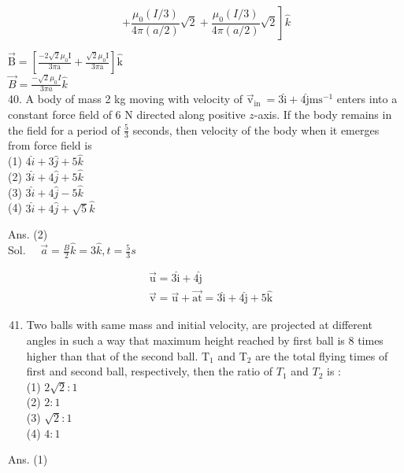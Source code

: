 \documentclass[10pt]{article}
\begin{document}
\[
\left.+\frac{\mu_{0}(I / 3)}{4 \pi(a / 2)} \sqrt{2}+\frac{\mu_{0}(I / 3)}{4 \pi(a / 2)} \sqrt{2}\right] \hat{k}
\]

\(\overrightarrow{\mathrm{B}}=\left[\frac{-2 \sqrt{2} \mu_{0} \mathrm{I}}{3 \pi \mathrm{a}}+\frac{\sqrt{2} \mu_{0} \mathrm{I}}{3 \pi \mathrm{a}}\right] \hat{\mathrm{k}}\)\\
\(\vec{B}=\frac{-\sqrt{2} \mu_{0} I}{3 \pi a} \hat{k}\)\\
40. A body of mass 2 kg moving with velocity of \(\overrightarrow{\mathrm{v}}_{\text {in }}=3 \hat{\mathrm{i}}+4 \hat{\mathrm{j}} \mathrm{ms}^{-1}\) enters into a constant force field of 6 N directed along positive \(z\)-axis. If the body remains in the field for a period of \(\frac{5}{3}\) seconds, then velocity of the body when it emerges from force field is\\
(1) \(4 \hat{i}+3 \hat{j}+5 \hat{k}\)\\
(2) \(3 \hat{i}+4 \hat{j}+5 \hat{k}\)\\
(3) \(3 \hat{i}+4 \hat{j}-5 \hat{k}\)\\
(4) \(3 \hat{i}+4 \hat{j}+\sqrt{5} \hat{k}\)

Ans. (2)\\
Sol. \(\quad \vec{a}=\frac{B}{2} \hat{k}=3 \hat{k}, t=\frac{5}{3} s\)

\[
\begin{aligned}
& \overrightarrow{\mathrm{u}}=3 \hat{\mathrm{i}}+4 \hat{\mathrm{j}} \\
& \overrightarrow{\mathrm{v}}=\overrightarrow{\mathrm{u}}+\overrightarrow{\mathrm{at}}=3 \hat{\mathrm{i}}+4 \hat{\mathrm{j}}+5 \hat{\mathrm{k}}
\end{aligned}
\]

\begin{enumerate}
  \setcounter{enumi}{40}
  \item Two balls with same mass and initial velocity, are projected at different angles in such a way that maximum height reached by first ball is 8 times higher than that of the second ball. \(\mathrm{T}_{1}\) and \(\mathrm{T}_{2}\) are the total flying times of first and second ball, respectively, then the ratio of \(T_{1}\) and \(T_{2}\) is :\\
(1) \(2 \sqrt{2}: 1\)\\
(2) \(2: 1\)\\
(3) \(\sqrt{2}: 1\)\\
(4) \(4: 1\)
\end{enumerate}

Ans. (1)
\end{document}

